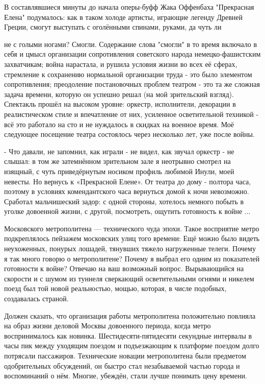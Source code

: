 В составлявшиеся минуты до начала оперы-буфф Жака Оффенбаха "Прекрасная Елена" подумалось: как в таком холоде артисты, играющие легенду Древней Греции, смогут выступать с оголёнными спинами, руками, да чуть ли

\label{232-1}
не с голыми ногами? Смогли. Содержание слова "смогли" в то время включало в себя и цмысл организации сопротивления советского народа немецко-фашистским захватчикам; война нарастала, и рушила условия жизни во всех её сферах, стремление к сохранению нормальной организации труда - это было элементом сопротивления; преодоление постановочных проблем театром - это та же сложная задача времени, которую он успешно решал (на мой зрительский взгляд). Спектакль прошёл на высоком уровне: оркестр, исполнители, декорации в реалистическом стиле и впечатление от них, усиленное осветительной техникой - всё это работало на сто и не нуждалось в скидках на военное время. Моё следующее посещение театра состоялось через несколько лет, уже после войны.

\label{233-1}
- Что давали, не запомнил, как играли - не видел, как звучал оркестр - не слышал: в том же затемнённом зрительном зале я неотрывно смотрел на изящный, с чуть приведёрнутым носиком профиль любимой Инули, моей невесты. Но вернусь к «Прекрасной Елене».
От театра до дому - полтора часа, поэтому в условиях комендантского часа вернуться домой к ночи невозможно. Сработал мальчишеский задор: с одной стороны, хотелось немного побыть в уголке довоенной жизни, с другой, посмотреть, ощутить готовность к войне ...

\label{234-1}
Московского метрополитена — технического чуда эпохи. Такое восприятие метро подкреплялось пейзажем московских улиц того времени: Ещё можно было видеть неухоженных, понурых лошадей, тянувших тяжело нагруженные телеги.
Почему я так много говорю о метрополитене? Почему я выбрал его одним из показателей готовности к войне? Отвечаю на ваш возможный вопрос. Вырывающийся на скорости и с шумом из туннеля сверкающий осветительными огнями и никелем поезд был той новой реальностью, мощью, которая, в числе подобных, создавалась страной.

\label{235-1}
Должен сказать, что организация работы метрополитена положительно повлияла на образ жизни деловой Москвы довоенного периода, когда метро воспринималось как новинка. Шестидесяти-пятидесяти секундные интервалы в часы пик между уходящим поездом и подъезжающим к платформе поездом долго потрясали пассажиров. Технические новации метрополитена были предметом одобрительных обсуждений, он быстро стал незабываемой частью города и воспоминаний о нём.  Многие, убеждён, стали лучше понимать цену времени.

